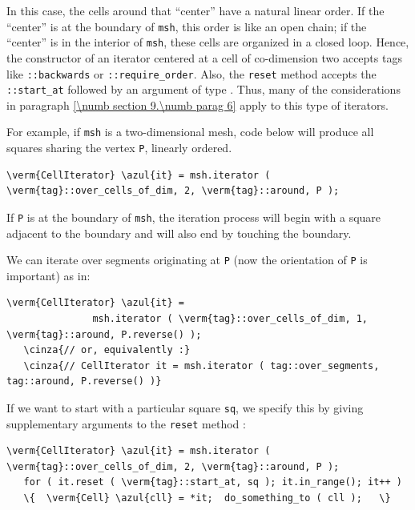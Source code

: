 In this case, the cells around that ``center'' have a natural linear order.
If the ``center'' is at the boundary of {\small\tt msh}, this order is like an
open chain; if the ``center'' is in the interior of {\small\tt msh}, these cells
are organized in a closed loop.
Hence, the constructor of an iterator centered at a cell of co-dimension two accepts
tags like {\small\tt{}::backwards} or {\small\tt{}::require\_order}.
Also, the {\small\tt reset} method accepts the {\small\tt{}::start\_at} followed
by an argument of type {\small\tt{}}.
Thus, many of the considerations in paragraph \ref{\numb section 9.\numb parag 6}
apply to this type of iterators.

For example, if {\small\tt msh} is a two-dimensional mesh, code below will produce
all squares sharing the vertex {\small\tt P}, linearly ordered.

\begin{Verbatim}[commandchars=\\\{\},formatcom=\small\tt,
   baselinestretch=0.94,framesep=2mm                      ]
   \verm{CellIterator} \azul{it} = msh.iterator ( \verm{tag}::over_cells_of_dim, 2, \verm{tag}::around, P );
\end{Verbatim}

If {\small\tt P} is at the boundary of {\small\tt msh}, the iteration process will begin
with a square adjacent to the boundary and will also end by touching the boundary.

We can iterate over segments originating at {\small\tt P} (now the orientation of
{\small\tt P} is important) as in:

\begin{Verbatim}[commandchars=\\\{\},formatcom=\small\tt,
   baselinestretch=0.94,framesep=2mm                      ]
   \verm{CellIterator} \azul{it} = 
               msh.iterator ( \verm{tag}::over_cells_of_dim, 1, \verm{tag}::around, P.reverse() );
   \cinza{// or, equivalently :}
   \cinza{// CellIterator it = msh.iterator ( tag::over_segments, tag::around, P.reverse() )}
\end{Verbatim}

If we want to start with a particular square {\small\tt sq}, we specify this by giving
supplementary arguments to the {\small\tt reset} method :

\begin{Verbatim}[commandchars=\\\{\},formatcom=\small\tt,
   baselinestretch=0.94,framesep=2mm                      ]
   \verm{CellIterator} \azul{it} = msh.iterator ( \verm{tag}::over_cells_of_dim, 2, \verm{tag}::around, P );
   for ( it.reset ( \verm{tag}::start_at, sq ); it.in_range(); it++ )
   \{  \verm{Cell} \azul{cll} = *it;  do_something_to ( cll );   \}
\end{Verbatim}

